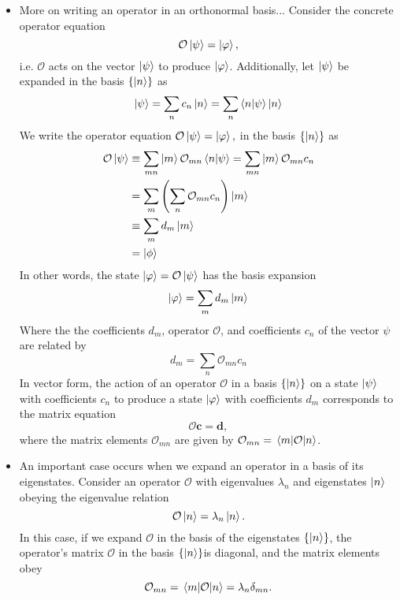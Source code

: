 \documentclass[11pt, a4paper]{article}
\renewcommand{\vec}[1]{\bm{#1}}  %
\renewcommand{\O}{\mathcal{O}}  %
\newcommand{\p}{\psi}  %
\begin{document}
\begin{itemize}
	\item More on writing an operator in an orthonormal basis... Consider the concrete operator equation
	\begin{equation*}
		\O \ket{\psi} = \ket{\varphi},
	\end{equation*}
	i.e. $ \O $ acts on the vector $ \ket{\psi} $ to produce $ \ket{\varphi} $. Additionally, let $ \ket{\psi} $ be expanded in the basis $ \{\ket{n} \} $ as
	\begin{equation*}
		\ket{\psi} = \sum_{n}c_{n} \ket{n} = \sum_{n} \braket{n}{\psi} \ket{n} 
	\end{equation*}
	 We write the operator equation $ \O \ket{\psi} = \ket{\varphi}, $ in the basis $ \{\ket{n}\} $ as
	\begin{align*}
		\O \ket{\p} &\equiv \sum_{mn}\ket{m}\O_{mn}\bra{n}  \ket{\psi} = \sum_{mn}\ket{m} \O_{mn}  c_{n}\\
		& = \sum_{m}\left(\sum_{n}\O_{mn}c_{n}\right) \ket{m} \\
		& \equiv \sum_{m}d_{m}\ket{m} \\
		& = \ket{\phi}
	\end{align*}
	In other words, the state $ \ket{\varphi} = \O \ket{\p} $ has the basis expansion
	\begin{equation*}
		\ket{\varphi} = \sum_{m} d_{m}\ket{m}
	\end{equation*}
	Where the the coefficients $ d_{m} $, operator $ \O $, and coefficients $ c_{n} $ of the vector $ \psi $ are related by 
	\begin{equation*}
		d_{m} = \sum_{n}\O_{mn} c_{n}
	\end{equation*}
	In vector form, the action of an operator $ \O $ in a basis $ \{\ket{n}\} $ on a state $ \ket{\p} $ with coefficients $ c_{n} $ to produce a state $ \ket{\varphi} $ with coefficients $ d_{m} $ corresponds to the matrix equation
	\begin{equation*}
		\bm{\O} \vec{c} = \vec{d},
	\end{equation*}
	where the matrix elements $ \O_{mn} $ are given by $ \O_{mn} = \mel{m}{\O}{n} $.
	
	\item An important case occurs when we expand an operator in a basis of its eigenstates. Consider an operator $ \O $ with eigenvalues $ \lambda_{n} $ and eigenstates $ \ket{n} $ obeying the eigenvalue relation
	\begin{equation*}
		\O \ket{n} = \lambda_{n} \ket{n}.
	\end{equation*}
	In this case, if we expand $ \O $ in the basis of the eigenstates $ \{\ket{n}\} $, the operator's matrix $ \bm{\O} $ in the basis $ \{\ket{n}\} $is diagonal, and the matrix elements obey
	\begin{equation*}
		\O_{mn} = \mel{m}{\O}{n} = \lambda_{n} \delta_{mn}.
	\end{equation*}
	
\end{itemize}
\end{document}

